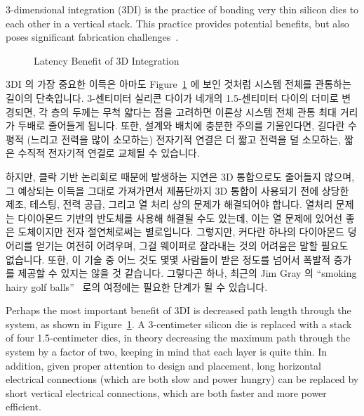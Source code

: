 3-dimensional integration (3DI) is the practice of bonding
very thin silicon dies to each other in a vertical stack.
This practice provides potential benefits, but also poses
significant fabrication challenges~\cite{JohnKnickerbocker2008:3DI}.

\fi

\begin{figure}[tb]
\centering
{}
\caption{Latency Benefit of 3D Integration}
\label{fig:cpu:Latency Benefit of 3D Integration}
\end{figure}

3DI 의 가장 중요한 이득은 아마도
Figure~\ref{fig:cpu:Latency Benefit of 3D Integration}
에 보인 것처럼 시스템 전체를 관통하는 길이의 단축입니다.
3-센티미터 실리콘 다이가 네개의 1.5-센티미터 다이의 더미로 변경되면, 각 층의
두께는 무척 얇다는 점을 고려하면 이론상 시스템 전체 관통 최대 거리가 두배로
줄어들게 됩니다.
또한, 설계와 배치에 충분한 주의를 기울인다면, 길다란 수평적 (느리고 전력을 많이
소모하는) 전자기적 연결은 더 짧고 전력을 덜 소모하는, 짧은 수직적 전자기적
연결로 교체될 수 있습니다.

하지만, 클락 기반 논리회로 때문에 발생하는 지연은 3D 통합으로도 줄어들지
않으며, 그 예상되는 이득을 그대로 가져가면서 제품단까지 3D 통합이 사용되기 전에
상당한 제조, 테스팅, 전력 공급, 그리고 열 처리 상의 문제가 해결되어야 합니다.
열처리 문제는 다이아몬드 기반의 반도체를 사용해 해결될 수도 있는데, 이는 열
문제에 있어선 좋은 도체이지만 전자 절연체로써는 별로입니다.
그렇지만, 커다란 하나의 다이아몬드 덩어리를 얻기는 여전히 어려우며, 그걸
웨이퍼로 잘라내는 것의 어려움은 말할 필요도 없습니다.
또한, 이 기술 중 어느 것도 몇몇 사람들이 받은 정도를 넘어서 폭발적 증가를
제공할 수 있지는 않을 것 같습니다.
그렇다곤 하나, 최근의 Jim Gray 의 
``smoking hairy golf balls''~\cite{JimGray2002SmokingHairyGolfBalls}
로의 여정에는 필요한 단계가 될 수 있습니다.

\iffalse

Perhaps the most important benefit of 3DI is decreased path length through
the system, as shown in
Figure~\ref{fig:cpu:Latency Benefit of 3D Integration}.
A 3-centimeter silicon die is replaced with a stack of four 1.5-centimeter
dies, in theory decreasing the maximum path through the system by a factor
of two, keeping in mind that each layer is quite thin.
In addition, given proper attention to design and placement,
long horizontal electrical connections (which are both slow and
power hungry) can be replaced by short vertical electrical connections,
which are both faster and more power efficient.

